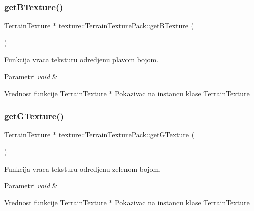 \subsubsection{\texorpdfstring{get\+B\+Texture()}{getBTexture()}}
{\footnotesize\ttfamily \hyperlink{classtexture_1_1TerrainTexture}{Terrain\+Texture} $\ast$ texture\+::\+Terrain\+Texture\+Pack\+::get\+B\+Texture (\begin{DoxyParamCaption}{ }\end{DoxyParamCaption})}



Funkcija vraca teksturu odredjenu plavom bojom. 


\begin{DoxyParams}{Parametri}
{\em void} & \\
\hline
\end{DoxyParams}
\begin{DoxyReturn}{Vrednost funkcije}
\hyperlink{classtexture_1_1TerrainTexture}{Terrain\+Texture} $\ast$ Pokazivac na instancu klase \hyperlink{classtexture_1_1TerrainTexture}{Terrain\+Texture} 
\end{DoxyReturn}
\mbox{\label{classtexture_1_1TerrainTexturePack_aeaf5b66e3cb399312e265eab07bcdf3f}} 
\subsubsection{\texorpdfstring{get\+G\+Texture()}{getGTexture()}}
{\footnotesize\ttfamily \hyperlink{classtexture_1_1TerrainTexture}{Terrain\+Texture} $\ast$ texture\+::\+Terrain\+Texture\+Pack\+::get\+G\+Texture (\begin{DoxyParamCaption}{ }\end{DoxyParamCaption})}



Funkcija vraca teksturu odredjenu zelenom bojom. 


\begin{DoxyParams}{Parametri}
{\em void} & \\
\hline
\end{DoxyParams}
\begin{DoxyReturn}{Vrednost funkcije}
\hyperlink{classtexture_1_1TerrainTexture}{Terrain\+Texture} $\ast$ Pokazivac na instancu klase \hyperlink{classtexture_1_1TerrainTexture}{Terrain\+Texture} 
\end{DoxyReturn}
\mbox{\label{classtexture_1_1TerrainTexturePack_a2e90d77d35768ae2c2c4a640b354fd2e}} 
